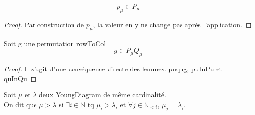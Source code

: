 \begin{lemma}[puInPu]
    \label{puInPu}
    \leanok
    \[ p_{\mu} \in P_{\mu} \]
\end{lemma}
\begin{proof}
    \leanok
    Par construction de $p_{\mu}$, la valeur en y ne change pas après l'application.
\end{proof}

\begin{lemma}[gInPuQu]
    \label{gInPuQu}
    \leanok
    Soit g une permutation rowToCol
    \[g \in P_{\mu}Q_{\mu}\]
\end{lemma}
\begin{proof}
    \leanok
    Il s'agit d'une conséquence directe des lemmes: puqug, puInPu et quInQu
\end{proof}

\begin{definition}[IneqYoungDiagram]
    \label{IneqYoungDiagram}
    \leanok
    Soit $\mu$ et $\lambda$ deux YoungDiagram de même cardinalité.\\
    On dit que $\mu > \lambda$ si $\exists i \in \mathbb{N}$ tq $\mu_{i}>\lambda_{i}$ et $\forall j \in \mathbb{N}_{<i}$, $\mu_{j} = \lambda_{j}$.
\end{definition}